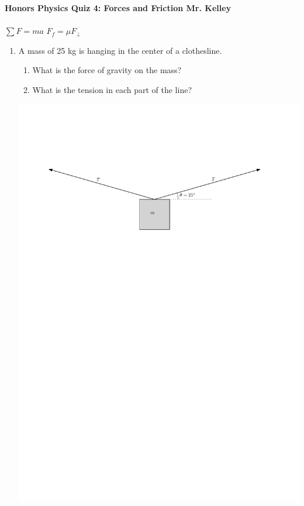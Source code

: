 \documentclass[12pt]{report}
\begin{document}
{\bf{Honors Physics} \hfill {Quiz 4: Forces and Friction} \hfill {Mr. Kelley}} \\ \\
\mbox{} \hfill $\sum F=ma$ \hfill $F_f=\mu F_\bot$ \hfill \mbox{}

\begin{enumerate}
\item A mass of 25 kg is hanging in the center of a clothesline.
\begin{enumerate}
\item What is the force of gravity on the mass?\\
\item What is the tension in each part of the line?\\
\end{enumerate}
\vspace{1cm}

\includegraphics{massClothesline} 


\end{enumerate}
\end{document}
